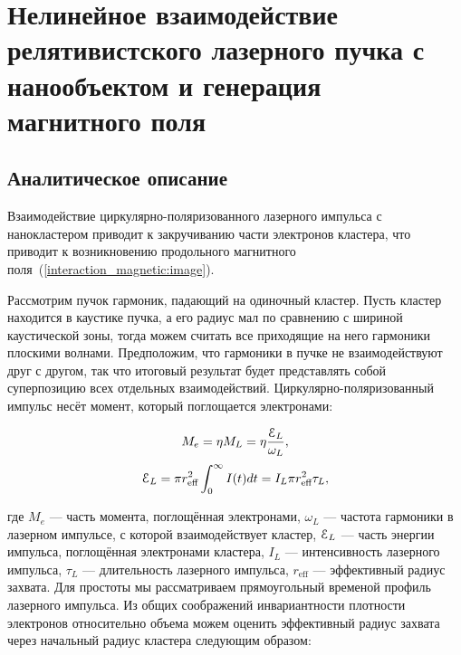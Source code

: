 \section{Нелинейное взаимодействие релятивистского лазерного пучка с нанообъектом и генерация магнитного поля}

\subsection{Аналитическое описание}

Взаимодействие циркулярно-поляризованного лазерного импульса с нанокластером приводит к закручиванию части электронов кластера, что приводит к возникновению продольного магнитного поля~(\autoref{interaction_magnetic:image}).


Рассмотрим пучок гармоник, падающий на одиночный кластер. Пусть кластер находится в каустике пучка, а его радиус мал по сравнению с шириной каустической зоны, тогда можем считать все приходящие на него гармоники плоскими волнами. Предположим, что гармоники в пучке не взаимодействуют друг с другом, так что итоговый результат будет представлять собой суперпозицию всех отдельных взаимодействий. Циркулярно-поляризованный импульс несёт момент, который поглощается электронами:

    \begin{equation}
        M_e = \eta M_L = \eta\frac{\EuScript{E}_L}{\omega_L},
    \end{equation}
    \begin{equation}
        \EuScript{E}_L = \pi r^2_{\textrm{eff}} \int_{0}^{\infty} I(t) dt = I_L \pi r^2_{\textrm{eff}}\tau_L,
        \label{Eps_L}
    \end{equation}

\noindent где $M_e$ --- часть момента, поглощённая электронами, $\omega_L$ --- частота гармоники в лазерном импульсе, с которой взаимодействует кластер, $\EuScript{E}_L$ --- часть энергии импульса, поглощённая электронами кластера, $I_L$ --- интенсивность лазерного импульса, $\tau_L$ --- длительность лазерного импульса, $r_{\textrm{eff}}$ --- эффективный радиус захвата. Для простоты мы рассматриваем прямоугольный временой профиль лазерного импульса. Из общих соображений инвариантности плотности электронов относительно объема можем оценить эффективный радиус захвата через начальный радиус кластера следующим образом:

